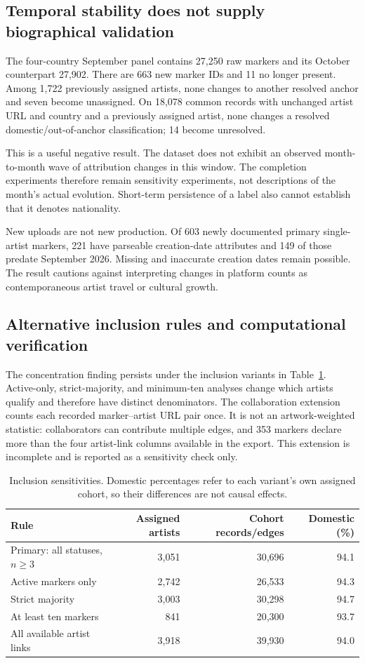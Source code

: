 \subsection{Temporal stability does not supply biographical validation}
The four-country September panel contains 27,250 raw markers and its October counterpart 27,902. There are 663 new marker IDs and 11 no longer present. Among 1,722 previously assigned artists, none changes to another resolved anchor and seven become unassigned. On 18,078 common records with unchanged artist URL and country and a previously assigned artist, none changes a resolved domestic/out-of-anchor classification; 14 become unresolved.

This is a useful negative result. The dataset does not exhibit an observed month-to-month wave of attribution changes in this window. The completion experiments therefore remain sensitivity experiments, not descriptions of the month's actual evolution. Short-term persistence of a label also cannot establish that it denotes nationality.

New uploads are not new production. Of 603 newly documented primary single-artist markers, 221 have parseable creation-date attributes and 149 of those predate September 2026. Missing and inaccurate creation dates remain possible. The result cautions against interpreting changes in platform counts as contemporaneous artist travel or cultural growth.

\subsection{Alternative inclusion rules and computational verification}
The concentration finding persists under the inclusion variants in Table~\ref{tab:sensitivity}. Active-only, strict-majority, and minimum-ten analyses change which artists qualify and therefore have distinct denominators. The collaboration extension counts each recorded marker--artist URL pair once. It is not an artwork-weighted statistic: collaborators can contribute multiple edges, and 353 markers declare more than the four artist-link columns available in the export. This extension is incomplete and is reported as a sensitivity check only.

\begin{table}[t]
\caption{Inclusion sensitivities. Domestic percentages refer to each variant's own assigned cohort, so their differences are not causal effects.}
\label{tab:sensitivity}\centering
\begin{tabular}{lrrr}\toprule
Rule & Assigned artists & Cohort records/edges & Domestic (\%)\\\midrule
Primary: all statuses, $n\geq3$ & 3,051 & 30,696 & 94.1\\
Active markers only & 2,742 & 26,533 & 94.3\\
Strict majority & 3,003 & 30,298 & 94.7\\
At least ten markers & 841 & 20,300 & 93.7\\
All available artist links & 3,918 & 39,930 & 94.0\\\bottomrule
\end{tabular}
\end{table}

